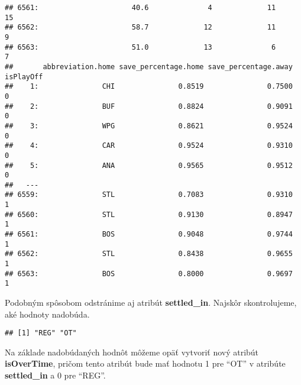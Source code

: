 \documentclass[
]{article}
\newenvironment{Shaded}{\begin{snugshade}}{\end{snugshade}}
\newcommand{\DecValTok}[1]{\textcolor[rgb]{0.00,0.00,0.81}{#1}}
\newcommand{\FunctionTok}[1]{\textcolor[rgb]{0.00,0.00,0.00}{#1}}
\newcommand{\NormalTok}[1]{#1}
\newcommand{\OtherTok}[1]{\textcolor[rgb]{0.56,0.35,0.01}{#1}}
\newcommand{\SpecialCharTok}[1]{\textcolor[rgb]{0.00,0.00,0.00}{#1}}
\newcommand{\StringTok}[1]{\textcolor[rgb]{0.31,0.60,0.02}{#1}}
\begin{document}
\begin{verbatim}
## 6561:                      40.6              4             11           15
## 6562:                      58.7             12             11            9
## 6563:                      51.0             13              6            7
##       abbreviation.home save_percentage.home save_percentage.away isPlayOff
##    1:               CHI               0.8519               0.7500         0
##    2:               BUF               0.8824               0.9091         0
##    3:               WPG               0.8621               0.9524         0
##    4:               CAR               0.9524               0.9310         0
##    5:               ANA               0.9565               0.9512         0
##   ---                                                                      
## 6559:               STL               0.7083               0.9310         1
## 6560:               STL               0.9130               0.8947         1
## 6561:               BOS               0.9048               0.9744         1
## 6562:               STL               0.8438               0.9655         1
## 6563:               BOS               0.8000               0.9697         1
\end{verbatim}

Podobným spôsobom odstránime aj atribút \textbf{settled\_in}. Najskôr
skontrolujeme, aké hodnoty nadobúda.

\begin{Shaded}
\end{Shaded}

\begin{verbatim}
## [1] "REG" "OT"
\end{verbatim}

Na základe nadobúdaných hodnôt môžeme opäť vytvoriť nový atribút
\textbf{isOverTime}, pričom tento atribút bude mať hodnotu 1 pre ``OT''
v atribúte \textbf{settled\_in} a 0 pre ``REG''.

\begin{Shaded}
\end{Shaded}
\end{document}

